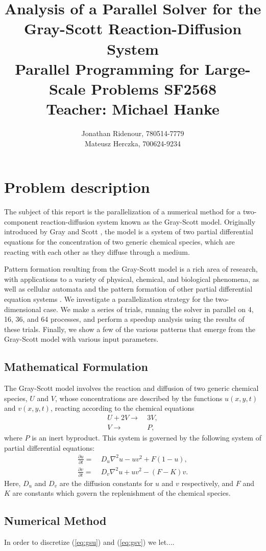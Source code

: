 \documentclass[a4paper,11pt]{article}
\title{ Analysis of a Parallel Solver for the Gray-Scott Reaction-Diffusion System\\ 
\vspace{1.2cm}
\large Parallel Programming for Large-Scale Problems SF2568 \\ 
Teacher: Michael Hanke}
\author{Jonathan Ridenour, 780514-7779\\
Mateusz Herczka, 700624-9234}
\newcommand{\ba}[1]{\begin{align*}    #1    \end{align*}}
\newcommand{\ban}[1]{\begin{align}    #1    \end{align}}
\begin{document}
\maketitle
\pagebreak
\section*{Problem description}
The subject of this report is the parallelization of a numerical method for a two-component reaction-diffusion system known as the Gray-Scott model.  Originally introduced by Gray and Scott \cite{Gray}, the model is a system of two partial differential equations for the concentration of two generic chemical species, which are reacting with each other as they diffuse through a medium.

Pattern formation resulting from the Gray-Scott model is a rich area of research, with applications to a variety of physical, chemical, and biological phenomena, as well as cellular automata and the pattern formation of other partial differential equation systems \cite{Wang}.  We investigate a parallelization strategy for the two-dimensional case.  We make a series of trials, running the solver in parallel on 4, 16, 36, and 64 processes, and perform a speedup analysis using the results of these trials. Finally, we show a few of the various patterns that emerge from the Gray-Scott model with various input parameters.

\subsection*{Mathematical Formulation}
The Gray-Scott model involves the reaction and diffusion of two generic chemical species, $U$ and $V$, whose concentrations are described by the functions $u(x, y, t)$ and $v(x,y,t)$, reacting according to the chemical equations
\ba{
U + 2V \rightarrow  & \ 3V,\\
V \rightarrow  & \ P,
}
where $P$ is an inert byproduct.  This system is governed by the following system of partial differential equations:
\begingroup
\addtolength{\jot}{0.5 em}
\ban{
\label{eq:gsu}
\frac{\partial u}{\partial t} = & \ D_u \nabla^2u - uv^2 + F(1-u),\\
\label{eq:gsv}
\frac{\partial v}{\partial t} = & \ D_v \nabla^2u + uv^2 - (F-K)v.
}
\endgroup
Here, $D_u$ and $D_v$ are the diffusion constants for $u$ and $v$ respectively, and $F$ and $K$ are constants which govern the replenishment of the chemical species.

\subsection*{Numerical Method}
In order to discretize (\ref{eq:gsu}) and (\ref{eq:gsv}) we let....
\end{document}
